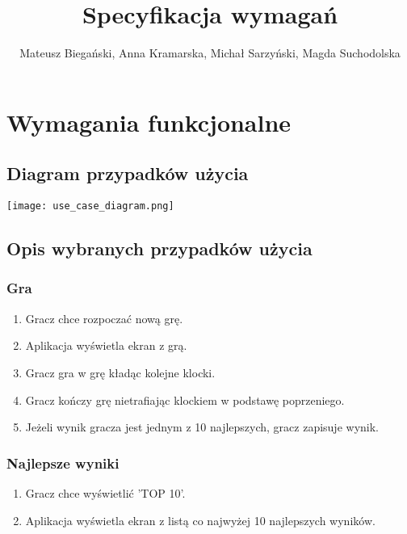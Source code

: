 \documentclass{article}
\begin{document}
\title{Specyfikacja wymagań}

\author{Mateusz Biegański, Anna Kramarska, Michał Sarzyński, Magda Suchodolska}
\maketitle

\section{Wymagania funkcjonalne}

\subsection{Diagram przypadków użycia}

\begin{center}
    \texttt{[image: use\_case\_diagram.png]}
\end{center}

\subsection{Opis wybranych przypadków użycia}

\subsubsection{Gra}

\begin{enumerate}
    \item Gracz chce rozpoczać nową grę.
    \item Aplikacja wyświetla ekran z grą.
    \item Gracz gra w grę kładąc kolejne klocki.
    \item Gracz kończy grę nietrafiając klockiem w podstawę poprzeniego.
    \item Jeżeli wynik gracza jest jednym z 10 najlepszych, gracz zapisuje wynik.
\end{enumerate}

\subsubsection{Najlepsze wyniki}
\begin{enumerate}
    \item Gracz chce wyświetlić 'TOP 10'.
    \item Aplikacja wyświetla ekran z listą co najwyżej 10 najlepszych wyników.
\end{enumerate}
\end{document}
